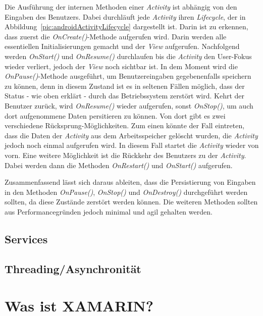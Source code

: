 Die Ausführung der internen Methoden einer \textit{Activity} ist abhängig von den Eingaben des Benutzers. Dabei durchläuft jede \textit{Activity} ihren \textit{Lifecycle}, der in Abbildung~\ref{pic:androidActivityLifecycle} dargestellt ist. Darin ist zu erkennen, dass zuerst die \textit{OnCreate()}-Methode aufgerufen wird. Darin werden alle essentiellen Initialisierungen gemacht und der \textit{View} aufgerufen. Nachfolgend werden \textit{OnStart()} und \textit{OnResume()} durchlaufen bis die \textit{Activity} den User-Fokus wieder verliert, jedoch der \textit{View} noch sichtbar ist. In dem Moment wird die \textit{OnPause()}-Methode ausgeführt, um Benutzereingaben gegebenenfalls speichern zu können, denn in diesem Zustand ist es in seltenen Fällen möglich, dass der Status - wie oben erklärt - durch das Betriebssystem zerstört wird. Kehrt der Benutzer zurück, wird \textit{OnResume()} wieder aufgerufen, sonst \textit{OnStop()}, um auch dort aufgenommene Daten persitieren zu können. Von dort gibt es zwei verschiedene Rücksprung-Möglichkeiten. Zum einen könnte der Fall eintreten, dass die Daten der \textit{Activity} aus dem Arbeitsspeicher gelöscht wurden, die \textit{Activity} jedoch noch einmal aufgerufen wird. In diesem Fall startet die \textit{Activity} wieder von vorn. Eine weitere Möglichkeit ist die Rückkehr des Benutzers zu der \textit{Activity}. Dabei werden dann die Methoden \textit{OnRestart()} und \textit{OnStart()} aufgerufen.

Zusammenfassend lässt sich daraus ableiten, dass die Persistierung von Eingaben in den Methoden \textit{OnPause()}, \textit{OnStop()} und \textit{OnDestroy()} durchgeführt werden sollten, da diese Zustände zerstört werden können. Die weiteren Methoden sollten aus Performancegründen jedoch minimal und agil gehalten werden.



\subsection{Services}
\label{ssec:android-services}

\subsection{Threading/Asynchronität}
\label{ssec:android-threading-async}

\section{Was ist XAMARIN?}
\label{sec:defintion-xamarin}

